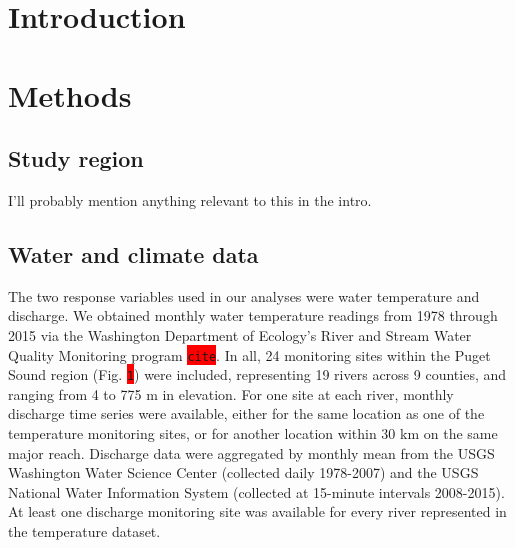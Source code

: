 \documentclass{article}
\begin{document}
    

\section*{Introduction}

\section*{Methods}

\subsection*{Study region}

I'll probably mention anything relevant to this in the intro.

\subsection*{Water and climate data}

The two response variables used in our analyses were water temperature and discharge. We obtained monthly water temperature readings from 1978 through 2015 via the Washington Department of Ecology's River and Stream Water Quality Monitoring program \colorbox{red}{\lstinline{cite}}. In all, 24 monitoring sites within the Puget Sound region (Fig. \colorbox{red}{\lstinline{1}}) were included, representing 19 rivers across 9 counties, and ranging from 4 to 775 m in elevation. For one site at each river, monthly discharge time series were available, either for the same location as one of the temperature monitoring sites, or for another location within 30 km on the same major reach. Discharge data were aggregated by monthly mean from the USGS Washington Water Science Center (collected daily 1978-2007) and the USGS National Water Information System (collected at 15-minute intervals 2008-2015). At least one discharge monitoring site was available for every river represented in the temperature dataset.
\end{document}

